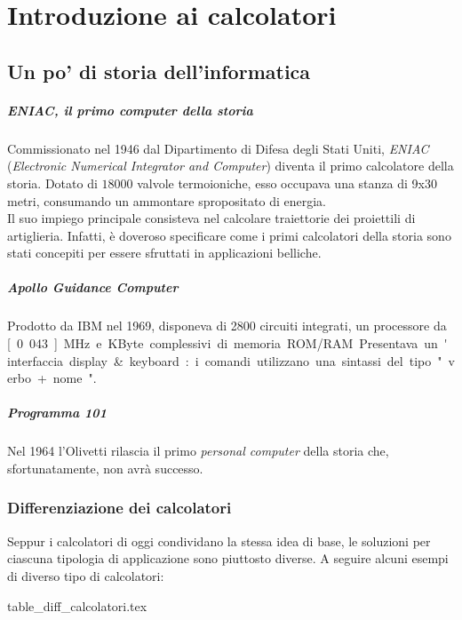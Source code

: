 \documentclass[class=book, crop=false]{standalone}
\begin{document}
\chapter{Introduzione ai calcolatori}
\section{Un po' di storia dell'informatica}
\paragraph{ENIAC, il primo computer della storia}
Commissionato nel 1946 dal Dipartimento di Difesa degli Stati Uniti, \emph{ENIAC} (\emph{Electronic Numerical Integrator and Computer}) diventa il primo calcolatore della storia.
Dotato di $18000$ valvole termoioniche, esso occupava una stanza di 9x30 metri, consumando un ammontare spropositato di energia.\\
Il suo impiego principale consisteva nel calcolare traiettorie dei proiettili di artiglieria. Infatti, è doveroso specificare come i primi calcolatori della storia sono stati concepiti per essere sfruttati in applicazioni belliche.

\paragraph{Apollo Guidance Computer}
Prodotto da IBM nel 1969, disponeva di 2800 circuiti integrati, un processore da \unit[0.043]{MHz} e \unit[152]{KByte}  complessivi di memoria ROM/RAM. Presentava un'interfaccia display \& keyboard: i comandi utilizzano una sintassi del tipo "verbo + nome".

\paragraph{Programma 101} Nel 1964 l'Olivetti rilascia il primo \emph{personal computer} della storia che, sfortunatamente, non avrà successo.

\subsection{Differenziazione dei calcolatori}
Seppur i calcolatori di oggi condividano la stessa idea di base, le soluzioni per ciascuna tipologia di applicazione sono piuttosto diverse. A seguire alcuni esempi di diverso tipo di calcolatori:

\begin{table}[H]
	\centering
	{table_diff_calcolatori.tex}
\end{table}
\end{document}
